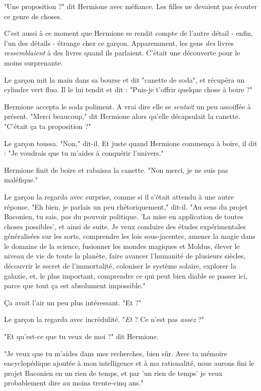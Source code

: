 "Une proposition ?" dit Hermione avec méfiance. Les filles ne devaient pas écouter ce genre de choses.

C'est aussi à ce moment que Hermione se rendit compte de l'autre détail - enfin, l'un des détails - étrange chez ce garçon. Apparemment, les gens \emph{des}  livres \emph{ressemblaient}  à des livres quand ils parlaient. C'était une découverte pour le moins surprenante.

Le garçon mit la main dans sa bourse et dit "canette de soda", et récupéra un cylindre vert fluo. Il le lui tendit et dit : "Puis-je t'offrir quelque chose à boire ?"

Hermione accepta le soda poliment. A vrai dire elle se \emph{sentait}  un peu assoiffée à présent. "Merci beaucoup," dit Hermione alors qu'elle décapsulait la canette. "C'était ça ta proposition ?"

Le garçon toussa. "Non," dit-il. Et juste quand Hermione commença à boire, il dit : "Je voudrais que tu m'aides à conquérir l'univers."

Hermione finit de boire et rabaissa la canette. "Non merci, je ne suis pas maléfique."

Le garçon la regarda avec surprise, comme si il s'était attendu à une autre réponse. "Eh bien, je parlais un peu rhétoriquement," dit-il. "Au sens du projet Baconien, tu sais, pas du pouvoir politique. 'La mise en application de toutes choses possibles', et ainsi de suite. Je veux conduire des études expérimentales généralisées sur les sorts, comprendre les lois sous-jacentes, amener la magie dans le domaine de la science, fusionner les mondes magiques et Moldus, élever le niveau de vie de toute la planète, faire avancer l'humanité de plusieurs siècles, découvrir le secret de l'immortalité, coloniser le système solaire, explorer la galaxie, et, le plus important, comprendre ce qui peut bien diable se passer ici, parce que tout ça est absolument impossible."

Ça avait l'air un peu plus intéressant. "Et ?"

Le garçon la regarda avec incrédulité. "\emph{Et}  ? Ce n'est pas \emph{assez } ?"

"Et qu'est-ce que tu veux de moi ?" dit Hermione.

"Je veux que tu m'aides dans mes recherches, bien sûr. Avec ta mémoire encyclopédique ajoutée à mon intelligence et à ma rationalité, nous aurons fini le projet Baconien en un rien de temps, et par 'un rien de temps' je veux probablement dire au moins trente-cinq ans."

